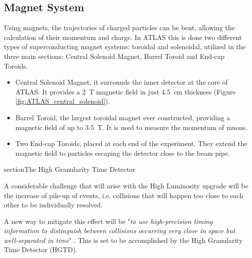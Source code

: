 \subsection{Magnet System}\label{sec:magnet_system}

\begin{figure}[!ht]
    \centering
    \hfill
    \centering
\end{figure}

Using magnets, the trajectories of charged particles can be bent, allowing the calculation of their momentum and charge. In ATLAS this is done two different types of superconducting magnet systems: toroidal and solenoidal, utilized in the three main sections: Central Solenoid Magnet, Barrel Toroid and End-cap Toroids.
\begin{itemize}
    \item Central Solenoid Magnet, it surrounds the inner detector at the core of ATLAS. It provides a \qty{2}{\tesla} magnetic field in just \qty{4.5}{\centi\meter} thickness (Figure \ref{fig:ATLAS_central_solenoid}).
    \item Barrel Toroid, the largest toroidal magnet ever constructed, providing a magnetic field of up to \qty{3.5}{\tesla}. It is used to measure the momentum of muons.
    \item Two End-cap Toroids, placed at each end of the experiment. They extend the magnetic field to particles escaping the detector close to the beam pipe.
\end{itemize}



section{The High Granularity Time Detector}\label{sec:HGTD}

A considerable challenge that will arise with the High Luminosity upgrade will be the increase of pile-up of events, i.e. collisions that will happen too close to each other to be individually resolved. 
 
A new way to mitigate this effect will be "\textit{to use high-precision timing information to distinguish between collisions occurring very close in space but well-separated in time}" \cite{CERN-LHCC-2020-007}. This is set to be accomplished by the High Granularity Time Detector (HGTD).

